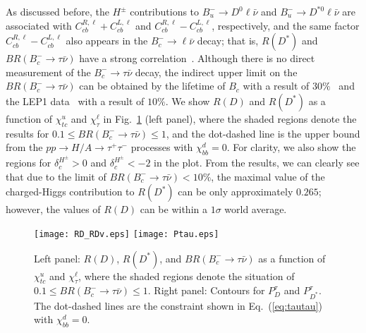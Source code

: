 \documentclass[prd,preprint,superscriptaddress,amsmath,amssymb]{revtex4}
\begin{document}
  As discussed before, the  $H^\pm$ contributions to $B^-_u \to D^0 \ell \bar \nu$ and $B^-_u \to D^{*0} \ell \bar \nu$ are associated with   $C^{R,\ell}_{cb} + C^{L,\ell}_{cb}$ and $C^{R,\ell}_{cb} - C^{L,\ell}_{cb}$, respectively, and the same factor  $C^{R,\ell}_{cb} - C^{L,\ell}_{cb}$ also appears in the $B^-_c \to \ell \bar \nu$ decay;  that is,  $R(D^*)$ and $BR(B^-_c \to \tau \bar\nu)$  have a strong correlation~\cite{Li:2016vvp,Alonso:2016oyd,Akeroyd:2017mhr}. Although there is no direct measurement of the $B^-_c \to \tau \bar\nu$ decay, the indirect upper limit  on the $BR(B^-_c \to \tau \bar\nu)$ can be obtained by the lifetime of $B_c$ with a result of  $30\%$~\cite{Alonso:2016oyd} and the LEP1 data~\cite{Akeroyd:2017mhr} with a result of $10\%$. We show $R(D)$ and $R(D^*)$ as a function of $\chi^{u}_{tc}$ and $\chi^{\ell}_{\tau}$  in  Fig.~\ref{fig:RD_RDv} (left panel), where the shaded regions denote the  results for  $0.1 \leq  BR(B^-_c \to \tau \bar \nu)\leq 1$,  and the dot-dashed line is the upper bound from the $pp\to H/A\to \tau^+ \tau^-$ processes with $\chi^d_{bb}=0$. For clarity, we also show  the  regions for $\delta^{H^\pm}_c >0$ and $\delta^{H^\pm}_c < -2$ in the plot. From the results, we can clearly see that due to the limit of $BR(B^-_c \to \tau \bar \nu)<10\%$, the maximal value of the charged-Higgs contribution to $R(D^*)$ can be only approximately $0.265$; however, the values of $R(D)$ can be  within a $1\sigma$  world average. 

 \begin{figure}[phtb]
\texttt{[image: RD\_RDv.eps]}
\texttt{[image: Ptau.eps]}
\caption{ Left panel: $R(D)$, $R(D^*)$, and $BR(B^-_c \to \tau \bar \nu)$ as a function of $\chi^u_{tc}$ and $\chi^\ell_\tau$, where the shaded regions denote  the situation of $0.1\leq BR(B^-_c \to \tau \bar \nu)  \leq 1$. Right panel: Contours for $P^\tau_D$ and $P^\tau_{D^*}$.  The dot-dashed lines are the constraint shown in Eq.~(\ref{eq:tautau}) with $\chi^d_{bb}=0$. }
\label{fig:RD_RDv}
\end{figure} 
\end{document}
